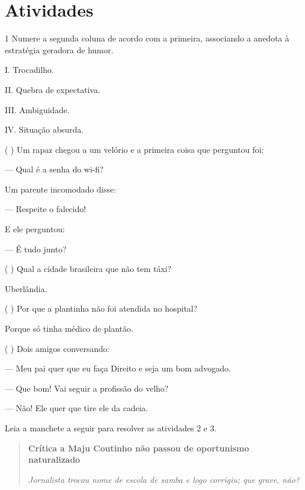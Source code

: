 \section{Atividades}

\num{1} Numere a segunda coluna de acordo com a primeira, associando a
anedota à estratégia geradora de humor.

\begin{multicols}{2}

I. Trocadilho.

II. Quebra de expectativa.

III. Ambiguidade.

IV. Situação absurda.

\columnbreak

(  ) Um rapaz chegou a um velório e a primeira coisa que perguntou foi:

--- Qual é a senha do wi-fi?

Um parente incomodado disse:

--- Respeite o falecido!

E ele perguntou:

--- É tudo junto?


(  ) Qual a cidade brasileira que não tem táxi?

Uberlândia.


(  ) Por que a plantinha não foi atendida no hospital?

Porque só tinha médico de plantão.


(  ) Dois amigos conversando:

--- Meu pai quer que eu faça Direito e seja um bom advogado.

--- Que bom! Vai seguir a profissão do velho?

--- Não! Ele quer que tire ele da cadeia.
\end{multicols}


Leia a manchete a seguir para resolver as atividades 2 e 3.

\begin{quote}
\textbf{Crítica a Maju Coutinho não passou de oportunismo naturalizado}

\emph{Jornalista trocou nome de escola de samba e logo corrigiu; que
grave, não?}

\end{quote}


